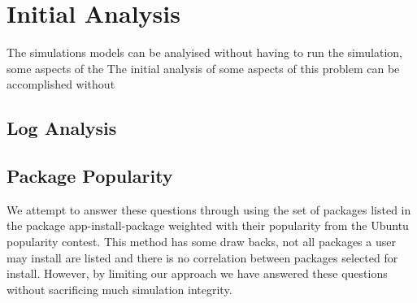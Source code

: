 \section{Initial Analysis}
{}The simulations models can be analyised without having to run the simulation, some aspects of the 
{}The initial analysis of some aspects of this problem can be accomplished without 


\subsection{Log Analysis}







\subsection{Package Popularity}
{}We attempt to answer these questions through using the set of packages listed in the package app-install-package
{}weighted with their popularity from the Ubuntu popularity contest.
{}This method has some draw backs, not all packages a user may install are listed and there is no correlation between packages selected for install.
{}However, by limiting our approach we have answered these questions without sacrificing much simulation integrity.


